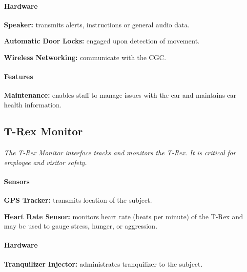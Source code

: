 \documentclass[12pt]{article}
\begin{document}
	\paragraph{Hardware}
	\begin{list}{}{}
		\item \textbf{Speaker:} transmits alerts, instructions or general audio data.
		\item \textbf{Automatic Door Locks:} engaged upon detection of movement. %
		\item \textbf{Wireless Networking:} communicate with the CGC.
	\end{list}
	
	\paragraph{Features}
	\begin{list}{}{}
		\item \textbf{Maintenance:} enables staff to manage issues with the car 
		and 	maintains car health information.
	\end{list}

	\subsection{T-Rex Monitor}
	\paragraph{} \textit{The T-Rex Monitor interface tracks and monitors the T-Rex. It is 
	critical for employee and visitor safety.}
	\paragraph{Sensors}
	\begin{list}{}{}
		\item \textbf{GPS Tracker:} transmits location of the subject.
		\item \textbf{Heart Rate Sensor:} monitors heart rate (beats per minute) of the T-Rex
		and may be used to gauge stress, hunger, or aggression.
	\end{list}
		
	\paragraph{Hardware}
	\begin{list}{}{}
		\item \textbf{Tranquilizer Injector:} administrates tranquilizer to the subject.
	\end{list}
\end{document}
